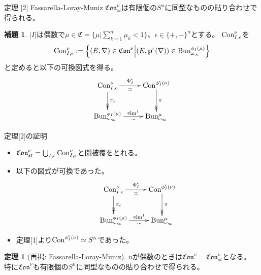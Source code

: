 \documentclass[dvipdfmx,notheorems]{beamer}
\theoremstyle{definition}
\newtheorem{thm}[definition]{定理}
\newtheorem{lem}[definition]{補題}
\begin{document}
\begin{frame}
    \begin{block}{定理 [2] Fassarella-Loray-Muniz}
        $\mathfrak{Con}_{st}^\nu$は有限個の$S^n$に同型なものの貼り合わせで得られる。
    \end{block}
    \begin{lem}
        $|I|$は偶数で$\mu \in \mathfrak{C}=\{\mu | \sum_{k=1}^{n}\mu_k <1 \}$、$\epsilon \in \{+,-\}^n$とする。
        ${\rm Con}^\nu_{I,\epsilon}$を
        $${\rm Con}^\nu_{I,\epsilon}:=\left\{(E,\nabla)\in \mathfrak{Con}^\nu
        \middle| (E,\mathbf{p}^\epsilon(\nabla))\in{\rm Bun}^{\phi_I(\mu)}_{\omega_\infty}\right\}$$
        と定めると以下の可換図式を得る。
        \begin{equation*}
            \xymatrix{
                {\rm Con}^\nu_{I,\epsilon}\ar[r]^-{\Phi_I^\epsilon}_-{\simeq} \ar@{->>}[d]^-{\pi_\epsilon}
                & {\rm Con}^{\phi_I^\epsilon(\nu)}\ar@{->>}[d]^-{\pi}\\
                {\rm Bun}^{\phi_I(\mu)}_{\omega_\infty}\ar[r]^-{\text{elm}^I}_-\simeq & {\rm Bun^\mu_{\omega_\infty}}
            }
        \end{equation*}
    \end{lem}
\end{frame}

\begin{frame}
    \begin{block}{定理[2]の証明}
        \begin{itemize}
            \item $\mathfrak{Con}^\nu_{st}=\bigcup_{I,\epsilon}{\rm Con}^\nu_{I,\epsilon}$と開被覆をとれる。
            \item 以下の図式が可換であった。
            \begin{equation*}
                \xymatrix{
                    {\rm Con}^\nu_{I,\epsilon}\ar[r]^-{\Phi_I^\epsilon}_-{\simeq} \ar@{->>}[d]^-{\pi_\epsilon}
                    & {\rm Con}^{{\phi_I^\epsilon}(\nu)}\ar@{->>}[d]^-{\pi}\\
                    {\rm Bun}^{\phi_I(\mu)}_{\omega_\infty}\ar[r]^-{\text{elm}^I}_-\simeq & {\rm Bun^\mu_{\omega_\infty}}
                }
            \end{equation*}
            \item 定理[1]より${\rm Con}^{\phi_I^\epsilon (\nu)}\simeq S^n$であった。
        \end{itemize}
    \end{block}
\end{frame}

\begin{frame}
    \begin{thm}[再掲:   Fassarella-Loray-Muniz]
        $n$が偶数のときは$\mathfrak{Con}^\nu = \mathfrak{Con}^\nu_{st}$となる。
        特に$\mathfrak{Con}^\nu$も有限個の$S^n$に同型なものの貼り合わせで得られる。
    \end{thm}
\end{frame}
\end{document}
